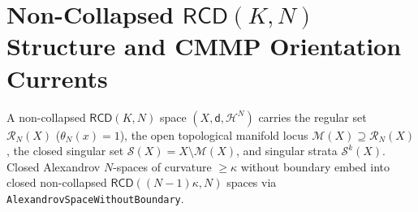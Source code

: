 \chapter{Non-Collapsed $\mathsf{RCD}(K, N)$ Structure and CMMP Orientation Currents}

\begin{definition}
\label{def_ncrcd_alexandrov}
\leanok
A non-collapsed $\mathsf{RCD}(K, N)$ space $(X, \mathsf{d}, \mathcal{H}^N)$ carries the regular set $\mathcal{R}_N(X)$ ($\theta_N(x) = 1$), the open topological manifold locus $\mathcal{M}(X) \supseteq \mathcal{R}_N(X)$, the closed singular set $\mathcal{S}(X) = X \setminus \mathcal{M}(X)$, and singular strata $\mathcal{S}^k(X)$. Closed Alexandrov $N$-spaces of curvature $\ge \kappa$ without boundary embed into closed non-collapsed $\mathsf{RCD}((N-1)\kappa, N)$ spaces via \texttt{AlexandrovSpaceWithoutBoundary}.
\end{definition}

